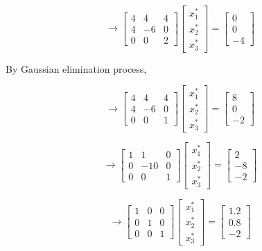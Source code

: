 \documentclass{article} %
\begin{document}
{    \[ \rightarrow \begin{bmatrix}
        4 & 4 & 4 \\
        4 & -6 & 0 \\
        0 & 0 & 2
    \end{bmatrix} \begin{bmatrix}
        x^*_1 \\ x^*_2 \\ x^*_3
    \end{bmatrix} = \begin{bmatrix}
        0 \\ 0 \\ -4
    \end{bmatrix} \]

    By Gaussian elimination process,

    \[ \rightarrow \begin{bmatrix}
        4 & 4 & 4 \\
        4 & -6 & 0 \\
        0 & 0 & 1
    \end{bmatrix} \begin{bmatrix}
        x^*_1 \\ x^*_2 \\ x^*_3
    \end{bmatrix} = \begin{bmatrix}
        8 \\ 0 \\ -2
    \end{bmatrix} \]

    \[ \rightarrow \begin{bmatrix}
        1 & 1 & 0 \\
        0 & -10 & 0 \\
        0 & 0 & 1
    \end{bmatrix} \begin{bmatrix}
        x^*_1 \\ x^*_2 \\ x^*_3
    \end{bmatrix} = \begin{bmatrix}
        2 \\ -8 \\ -2
    \end{bmatrix} \]

    \[ \rightarrow \begin{bmatrix}
        1 & 0 & 0 \\
        0 & 1 & 0 \\
        0 & 0 & 1
    \end{bmatrix} \begin{bmatrix}
        x^*_1 \\ x^*_2 \\ x^*_3
    \end{bmatrix} = \begin{bmatrix}
        1.2 \\ 0.8 \\ -2
    \end{bmatrix} \]

}
\end{document}
